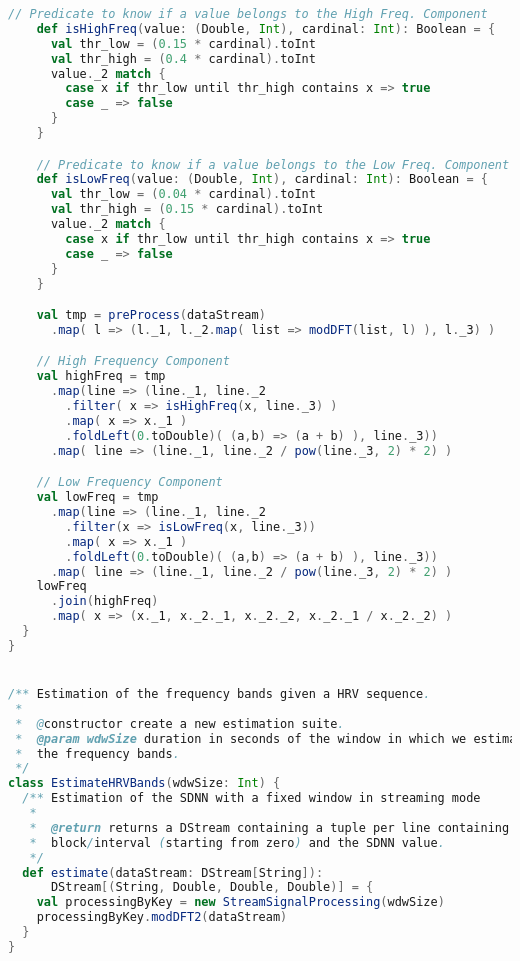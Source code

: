 \begin{lstlisting}[language=Scala,caption={Implementation of the \texttt{HRVBands} algorithm.},label=code:hrvbands]
    // Predicate to know if a value belongs to the High Freq. Component
    def isHighFreq(value: (Double, Int), cardinal: Int): Boolean = {
      val thr_low = (0.15 * cardinal).toInt
      val thr_high = (0.4 * cardinal).toInt
      value._2 match {
        case x if thr_low until thr_high contains x => true
        case _ => false
      }
    }

    // Predicate to know if a value belongs to the Low Freq. Component
    def isLowFreq(value: (Double, Int), cardinal: Int): Boolean = {
      val thr_low = (0.04 * cardinal).toInt
      val thr_high = (0.15 * cardinal).toInt
      value._2 match {
        case x if thr_low until thr_high contains x => true
        case _ => false
      }
    }

    val tmp = preProcess(dataStream)
      .map( l => (l._1, l._2.map( list => modDFT(list, l) ), l._3) )

    // High Frequency Component
    val highFreq = tmp
      .map(line => (line._1, line._2
        .filter( x => isHighFreq(x, line._3) )
        .map( x => x._1 )
        .foldLeft(0.toDouble)( (a,b) => (a + b) ), line._3))
      .map( line => (line._1, line._2 / pow(line._3, 2) * 2) )

    // Low Frequency Component
    val lowFreq = tmp
      .map(line => (line._1, line._2
        .filter(x => isLowFreq(x, line._3))
        .map( x => x._1 )
        .foldLeft(0.toDouble)( (a,b) => (a + b) ), line._3))
      .map( line => (line._1, line._2 / pow(line._3, 2) * 2) )
    lowFreq
      .join(highFreq)
      .map( x => (x._1, x._2._1, x._2._2, x._2._1 / x._2._2) )
  }
}


/** Estimation of the frequency bands given a HRV sequence.
 *
 *  @constructor create a new estimation suite.
 *  @param wdwSize duration in seconds of the window in which we estimate
 *  the frequency bands.
 */
class EstimateHRVBands(wdwSize: Int) {
  /** Estimation of the SDNN with a fixed window in streaming mode
   *
   *  @return returns a DStream containing a tuple per line containing the time
   *  block/interval (starting from zero) and the SDNN value.
   */
  def estimate(dataStream: DStream[String]):
      DStream[(String, Double, Double, Double)] = {
    val processingByKey = new StreamSignalProcessing(wdwSize)
    processingByKey.modDFT2(dataStream)
  }
}
\end{lstlisting}

